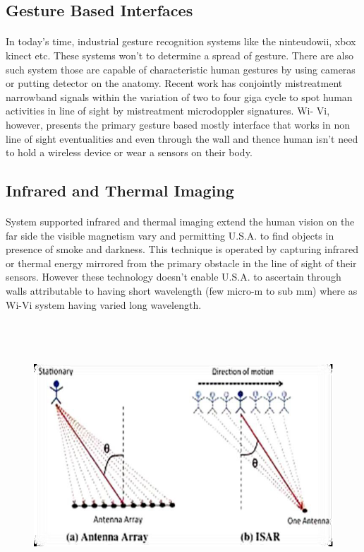 \documentclass[a4paper,12pt,oneside]{article}
\begin{document}
\subsection{Gesture Based Interfaces}
\paragraph{}
In today’s time, industrial gesture recognition systems like the ninteudowii, xbox kinect
etc. These systems won’t to determine a spread of gesture. There are also such system those are
capable of characteristic human gestures by using cameras or putting detector on the anatomy.
Recent work has conjointly mistreatment narrowband signals within the variation of two to four
giga cycle to spot human activities in line of sight by mistreatment microdoppler signatures. Wi-
Vi, however, presents the primary gesture based mostly interface that works in non line of sight
eventualities and even through the wall and thence human isn't need to hold a wireless device or
wear a sensors on their body.
\subsection{Infrared and Thermal Imaging}
\paragraph{}
System supported infrared and thermal imaging extend the human vision on the far side
the visible magnetism vary and permitting U.S.A. to find objects in presence of smoke and
darkness. This technique is operated by capturing infrared or thermal energy mirrored from the
primary obstacle in the line of sight of their sensors. However these technology doesn't enable
U.S.A. to ascertain through walls attributable to having short wavelength (few micro-m to sub mm)
where as Wi-Vi system having varied long wavelength.

\begin{figure}[H]
\centering
\includegraphics[height=10cm,width=15cm]{4.PNG}
\end{figure}
\end{document}
